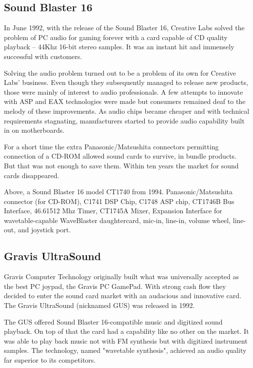 \subsection{Sound Blaster 16}
 In June 1992, with the release of the Sound Blaster 16, Creative Labs solved the problem of PC audio for gaming forever with a card capable of CD quality playback -- 44Khz 16-bit stereo samples. It was an instant hit and immensely successful with customers.\\
\par
{}
\par
Solving the audio problem turned out to be a problem of its own for Creative Labs' business. Even though they subsequently managed to release new products, those were mainly of interest to audio professionals. A few attempts to innovate with ASP and EAX technologies were made but consumers remained deaf to the melody of these improvements. As audio chips became cheaper and with technical requirements stagnating, manufacturers started to provide audio capability built in on motherboards.\\
\par
For a short time the extra Panasonic/Matsushita connectors permitting connection of a CD-ROM allowed sound cards to survive, in bundle products. But that was not enough to save them. Within ten years the market for sound cards disappeared.\\
\par
{}
\par
Above, a Sound Blaster 16 model CT1740 from 1994.  Panasonic/Matsushita connector (for CD-ROM),  C1741 DSP Chip,  C1748 ASP chip,  CT1746B Bus Interface,  46.61512 Mhz Timer,  CT1745A Mixer,  Expansion Interface for wavetable-capable WaveBlaster daughtercard,  mic-in, line-in, volume wheel, line-out, and joystick port.







\subsection{Gravis UltraSound}
Gravis Computer Technology originally built what was universally accepted as the best PC joypad, the Gravis PC GamePad. With strong cash flow they decided to enter the sound card market with an audacious and innovative card. The Gravis UltraSound (nicknamed GUS) was released in 1992.\\
\par
The GUS offered Sound Blaster 16-compatible music and digitized sound playback. On top of that the card had a capability like no other on the market. It was able to play back music not with FM synthesis but with digitized instrument samples. The technology, named "wavetable synthesis", achieved an audio quality far superior to its competitors.


